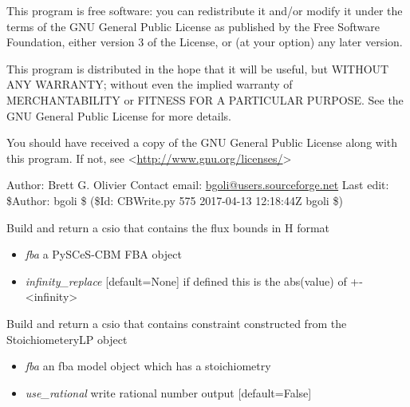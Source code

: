 \documentclass[a4paper,11pt,english]{sphinxmanual}
\begin{document}
This program is free software: you can redistribute it and/or modify
it under the terms of the GNU General Public License as published by
the Free Software Foundation, either version 3 of the License, or
(at your option) any later version.

This program is distributed in the hope that it will be useful,
but WITHOUT ANY WARRANTY; without even the implied warranty of
MERCHANTABILITY or FITNESS FOR A PARTICULAR PURPOSE.  See the
GNU General Public License for more details.

You should have received a copy of the GNU General Public License
along with this program.  If not, see \textless{}\url{http://www.gnu.org/licenses/}\textgreater{}

Author: Brett G. Olivier
Contact email: \href{mailto:bgoli@users.sourceforge.net}{bgoli@users.sourceforge.net}
Last edit: \$Author: bgoli \$ (\$Id: CBWrite.py 575 2017-04-13 12:18:44Z bgoli \$)

\begin{fulllineitems}
\label{modules_doc:cbmpy.CBWrite.BuildHformatFluxBounds}
Build and return a csio that contains the flux bounds in H format
\begin{itemize}
\item {} 
\emph{fba} a PySCeS-CBM FBA object

\item {} 
\emph{infinity\_replace} {[}default=None{]} if defined this is the abs(value) of +-\textless{}infinity\textgreater{}

\end{itemize}

\end{fulllineitems}


\begin{fulllineitems}
\label{modules_doc:cbmpy.CBWrite.BuildLPConstraints}
Build and return a csio that contains constraint constructed from
the StoichiometeryLP object
\begin{itemize}
\item {} 
\emph{fba} an fba model object which has a stoichiometry

\item {} 
\emph{use\_rational} write rational number output {[}default=False{]}

\end{itemize}

\end{fulllineitems}
\end{document}
